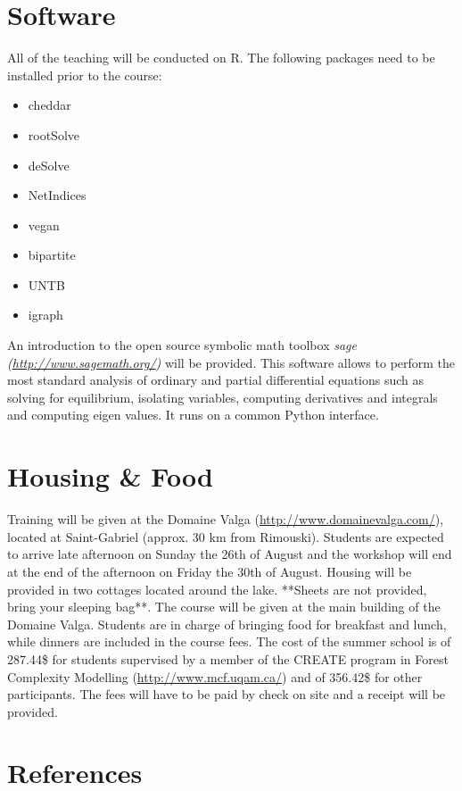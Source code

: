 \documentclass[11]{article}
\begin{document}
	\section*{Software}
All of the teaching will be conducted on R. The following packages need to be installed prior to the course:
	\begin{itemize}
		\item cheddar
		\item rootSolve
		\item deSolve
		\item NetIndices
		\item vegan
		\item bipartite
		\item UNTB
		\item igraph
	\end{itemize}
An introduction to the open source symbolic math toolbox \emph{sage (\url{http://www.sagemath.org/})} will be provided. This software allows to perform the most standard analysis of ordinary and partial differential equations such as solving for equilibrium, isolating variables, computing derivatives and integrals and computing eigen values. It runs on a common Python interface. 

	\section*{Housing \& Food}
Training will be given at the Domaine Valga  (\url{http://www.domainevalga.com/}), located at Saint-Gabriel (approx. 30 km from Rimouski). Students are expected to arrive late afternoon on Sunday the 26th of August and the workshop will end at the end of the afternoon on Friday the 30th of August. Housing will be provided in two cottages located around the lake.  **Sheets are not provided, bring your sleeping bag**. The course will be given at the main building of the Domaine Valga. Students are in charge of bringing food for breakfast and lunch, while dinners are included in the course fees. The cost of the summer school is of 287.44\$ for students supervised by a member of the CREATE program in Forest Complexity Modelling (\url{http://www.mcf.uqam.ca/}) and of 356.42\$ for other participants. The fees will have to be paid by check on site and a receipt will be provided. 

	\section*{References}
\end{document}
